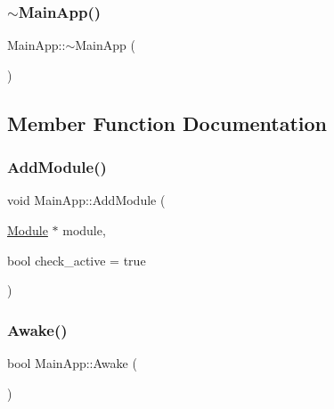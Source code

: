 \mbox{\label{class_main_app_a1da72f01017840ab6165e33b76cc8482}} 
\subsubsection{\texorpdfstring{$\sim$MainApp()}{~MainApp()}}
{\footnotesize\ttfamily Main\+App\+::$\sim$\+Main\+App (\begin{DoxyParamCaption}{ }\end{DoxyParamCaption})\hspace{0.3cm}{\ttfamily [virtual]}}



\subsection{Member Function Documentation}
\mbox{\label{class_main_app_a2ce751f8952d6486d8c1f0dcf7f35a97}} 
\subsubsection{\texorpdfstring{AddModule()}{AddModule()}}
{\footnotesize\ttfamily void Main\+App\+::\+Add\+Module (\begin{DoxyParamCaption}\item[{\mbox{\hyperlink{class_module}{Module}} $\ast$}]{module,  }\item[{bool}]{check\+\_\+active = {\ttfamily true} }\end{DoxyParamCaption})}

\mbox{\label{class_main_app_a63073f5b488b5ed746f3613cf51cb09f}} 
\subsubsection{\texorpdfstring{Awake()}{Awake()}}
{\footnotesize\ttfamily bool Main\+App\+::\+Awake (\begin{DoxyParamCaption}{ }\end{DoxyParamCaption})}

\mbox{\label{class_main_app_abe7994c7f7afdd4e154ff03cc7c606bb}} 
